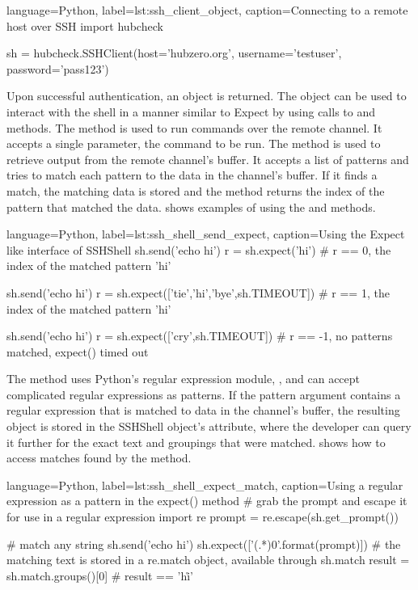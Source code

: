 \begin{xcode}{%
  language=Python,%
  label=lst:ssh_client_object,%
  caption={Connecting to a remote host over SSH}%
}
import hubcheck

sh = hubcheck.SSHClient(host='hubzero.org',
                        username='testuser',
                        password='pass123')
\end{xcode}

Upon successful authentication, an  object is returned. The
 object can be used to interact with the shell in a manner
similar to Expect by using calls to  and 
methods.  The  method is used to run commands over the remote
channel. It accepts a single parameter, the command to be run. The
 method is used to retrieve output from the remote channel's
buffer. It accepts a list of patterns and tries to match each pattern to the
data in the channel's buffer.  If it finds a match, the matching data is stored
and the method returns the index of the pattern that matched the data.
 shows examples of using the 
and  methods.

\begin{xcode}{%
  language=Python,%
  label=lst:ssh_shell_send_expect,%
  caption={Using the Expect like interface of SSHShell}%
}
sh.send('echo hi')
r = sh.expect('hi')
# r == 0, the index of the matched pattern 'hi'

sh.send('echo hi')
r = sh.expect(['tie','hi','bye',sh.TIMEOUT])
# r == 1, the index of the matched pattern 'hi'

sh.send('echo hi')
r = sh.expect(['cry',sh.TIMEOUT])
# r == -1, no patterns matched, expect() timed out
\end{xcode}

The  method uses Python's regular expression module,
, and can accept complicated regular expressions as patterns. If
the pattern argument contains a regular expression that is matched to data in
the channel's buffer, the resulting  object is stored in the
SSHShell object's  attribute, where the developer can query
it further for the exact text and groupings that were matched.
 shows how to access matches found by the
 method.

\begin{xcode}{%
  language=Python,%
  label=lst:ssh_shell_expect_match,%
  caption={Using a regular expression as a pattern in the expect() method}%
}
# grab the prompt and escape it for use in a regular expression
import re
prompt = re.escape(sh.get_prompt())

# match any string
sh.send('echo hi')
sh.expect(['(.*){0}'.format(prompt)])
# the matching text is stored in a re.match object, available through sh.match
result = sh.match.groups()[0]
# result == 'hi\r\n'
\end{xcode}


